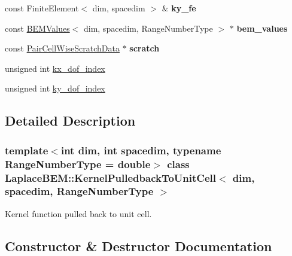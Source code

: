 \begin{DoxyCompactItemize}
\mbox{\label{classLaplaceBEM_1_1KernelPulledbackToUnitCell_a664dab9bbbf454f7636c61f43b4829eb}} 
const Finite\+Element$<$ dim, spacedim $>$ \& {\bfseries ky\+\_\+fe}
\item 
\mbox{\label{classLaplaceBEM_1_1KernelPulledbackToUnitCell_a00b7c35e8a15b73113921af1eb3a3539}} 
const \hyperlink{classLaplaceBEM_1_1BEMValues}{B\+E\+M\+Values}$<$ dim, spacedim, Range\+Number\+Type $>$ $\ast$ {\bfseries bem\+\_\+values}
\item 
\mbox{\label{classLaplaceBEM_1_1KernelPulledbackToUnitCell_a39328e6d06348a2a4841f91077ea2a6c}} 
const \hyperlink{structLaplaceBEM_1_1PairCellWiseScratchData}{Pair\+Cell\+Wise\+Scratch\+Data} $\ast$ {\bfseries scratch}
\item 
unsigned int \hyperlink{classLaplaceBEM_1_1KernelPulledbackToUnitCell_a66ba57ad86025978e5e5580c822aef89}{kx\+\_\+dof\+\_\+index}
\item 
unsigned int \hyperlink{classLaplaceBEM_1_1KernelPulledbackToUnitCell_ae6f3e4bc6cf09546bf11d01812f9b692}{ky\+\_\+dof\+\_\+index}
\end{DoxyCompactItemize}


\subsection{Detailed Description}
\subsubsection*{template$<$int dim, int spacedim, typename Range\+Number\+Type = double$>$\newline
class Laplace\+B\+E\+M\+::\+Kernel\+Pulledback\+To\+Unit\+Cell$<$ dim, spacedim, Range\+Number\+Type $>$}

Kernel function pulled back to unit cell. 

\subsection{Constructor \& Destructor Documentation}
\mbox{\label{classLaplaceBEM_1_1KernelPulledbackToUnitCell_a344ad653c5e57498cc005b5b683e8db6}} 
